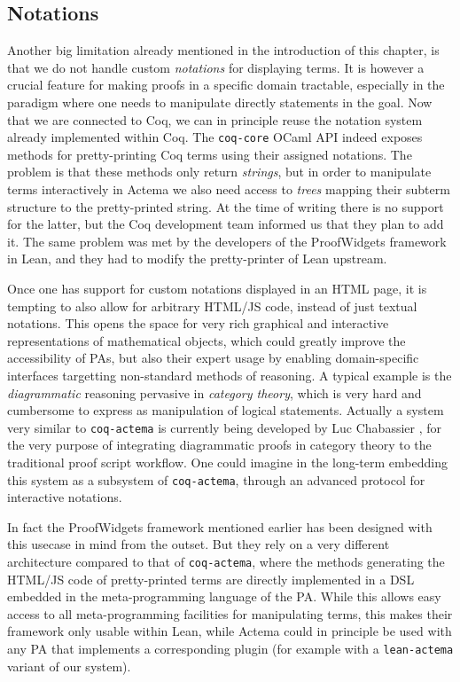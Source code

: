 \subsection{Notations}

Another big limitation already mentioned in the introduction of this chapter, is
that we do not handle custom \emph{notations} for displaying
terms. It is however a crucial feature for making proofs in a specific
domain tractable, especially in the  paradigm where one needs to
manipulate directly statements in the goal. Now that we are connected to Coq, we
can in principle reuse the notation system already implemented within Coq. The
\texttt{coq-core} OCaml API indeed exposes methods for pretty-printing Coq terms
using their assigned notations. The problem is that these methods only return
\emph{strings}, but in order to manipulate terms interactively in Actema we also
need access to \emph{trees} mapping their subterm structure to the
pretty-printed string. At the time of writing there is no support for the
latter, but the Coq development team informed us that they plan to add it. The
same problem was met by the developers of the ProofWidgets framework in Lean,
and they had to modify the pretty-printer of Lean upstream.

Once one has support for custom notations displayed in an HTML page, it is
tempting to also allow for arbitrary HTML/JS code, instead of just textual
notations. This opens the space for very rich graphical and interactive
representations of mathematical objects, which could greatly improve the
accessibility of PAs, but also their expert usage by enabling domain-specific
interfaces targetting non-standard methods of reasoning. A typical example is
the \emph{diagrammatic} reasoning pervasive in \emph{category theory}, which is
very hard and cumbersome to express as manipulation of logical statements.
Actually a system very similar to \texttt{coq-actema} is currently being
developed by Luc Chabassier \cite{LucTalk}, for the very purpose of integrating
diagrammatic proofs in category theory to the traditional proof script workflow.
One could imagine in the long-term embedding this system as a subsystem of
\texttt{coq-actema}, through an advanced protocol for interactive notations.

In fact the ProofWidgets framework mentioned earlier has been designed with this
usecase in mind from the outset. But they rely on a very different architecture
compared to that of \texttt{coq-actema}, where the methods generating the
HTML/JS code of pretty-printed terms are directly implemented in a DSL embedded
in the meta-programming language of the PA. While this allows easy access to all
meta-programming facilities for manipulating terms, this makes their framework
only usable within Lean, while Actema could in principle be used with any PA
that implements a corresponding plugin (for example with a \texttt{lean-actema}
variant of our system).

